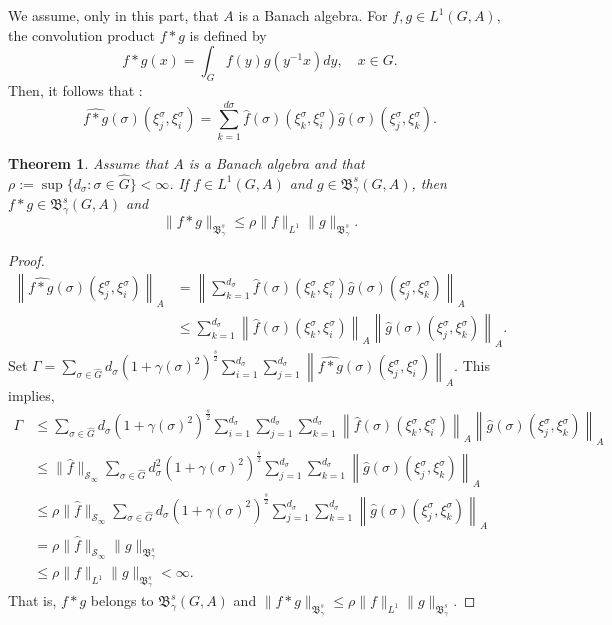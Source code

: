 \documentclass[12pt]{amsart}%
\newtheorem{theorem}{Theorem}[section]
\begin{document}
We assume, only in this part, that $A$ is a Banach algebra.  For $f,g \in L^1(G,A)$,  the convolution product $f\ast g$ is defined by 
\begin{equation}
f\ast g (x)=\int_G f(y)g(y^{-1}x)dy,\quad x\in G.
\end{equation}
Then, it  follows that \cite{Assiamoua2}:
\begin{equation}
\widehat{f\ast g}(\sigma)(\xi_j^\sigma,\xi_i^\sigma)=\sum\limits_{k=1}^{d\sigma}\widehat{f}(\sigma)(\xi_k^\sigma,\xi_i^\sigma)\widehat{g}(\sigma)(\xi_j^\sigma,\xi_k^\sigma). 
\end{equation}
\begin{theorem}
Assume that $A$ is a Banach algebra and  that $\rho:=\sup\{d_\sigma :\sigma\in \widehat{G}\}<\infty$.  If $f\in L^1(G,A)$ and  $g\in \mathfrak{B}^{s}_\gamma(G,A)$, then $f\ast g\in   \mathfrak{B}^{s}_\gamma(G,A)$ and 
$$\|f\ast g\|_{\mathfrak{B}^{s}_\gamma}\leq \rho \|f\|_{L^1}\|g\|_{\mathfrak{B}^{s}_\gamma}.$$
\end{theorem}
\begin{proof}
\begin{align*}
\left\|\widehat{f\ast g}(\sigma)(\xi_j^\sigma,\xi_i^\sigma)\right\|_A &=\left\|\sum\limits_{k=1}^{d_\sigma}\widehat{f}(\sigma)(\xi_k^\sigma,\xi_i^\sigma)\widehat{g}(\sigma)(\xi_j^\sigma,\xi_k^\sigma)\right\|_A\\
&\leq  \sum\limits_{k=1}^{d_\sigma}\left\|\widehat{f}(\sigma)(\xi_k^\sigma,\xi_i^\sigma)\right\|_A\left\|\widehat{g}(\sigma)(\xi_j^\sigma,\xi_k^\sigma)\right\|_A. 
\end{align*}
Set  $\Gamma=\sum\limits_{\sigma\in \widehat{G}}d_\sigma (1+\gamma (\sigma)^2)^{\frac{s}{2}}\sum\limits_{i=1}^{d_\sigma}\sum\limits_{j=1}^{d_\sigma}\left\|\widehat{f\ast g}(\sigma)(\xi_j^\sigma,\xi_i^\sigma)\right\|_A$.
This implies, 
\begin{align*}
\Gamma&\leq \sum_{\sigma\in \widehat{G}}d_\sigma (1+\gamma (\sigma)^2)^{\frac{s}{2}} \sum_{i=1}^{d_\sigma}\sum_{j=1}^{d_\sigma}\sum\limits_{k=1}^{d_\sigma}
\left\|\widehat{f}(\sigma)(\xi_k^\sigma,\xi_i^\sigma)\right\|_A
\left\|\widehat{g}(\sigma)(\xi_j^\sigma,\xi_k^\sigma)\right\|_A\\
&\leq \|\widehat{f}\|_{\mathscr{S}_\infty}\sum_{\sigma\in \widehat{G}}d_\sigma^2 (1+\gamma (\sigma)^2)^{\frac{s}{2}} \sum_{j=1}^{d_\sigma}\sum\limits_{k=1}^{d_\sigma}
\left\|\widehat{g}(\sigma)(\xi_j^\sigma,\xi_k^\sigma)\right\|_A\\
&\leq \rho\|\widehat{f}\|_{\mathscr{S}_\infty}\sum_{\sigma\in \widehat{G}}d_\sigma (1+\gamma (\sigma)^2)^{\frac{s}{2}} \sum_{j=1}^{d_\sigma}\sum\limits_{k=1}^{d_\sigma}
\left\|\widehat{g}(\sigma)(\xi_j^\sigma,\xi_k^\sigma)\right\|_A\\
&=\rho\|\widehat{f}\|_{\mathscr{S}_\infty}\|g\|_{\mathfrak{B}^{s}_\gamma}\\
&\leq \rho\|f\|_{L^1}\|g\|_{\mathfrak{B}^{s}_\gamma}<\infty.
\end{align*}
That is, $f\ast g$ belongs to $\mathfrak{B}^{s}_\gamma (G,A)$ and  $\|f\ast g\|_{\mathfrak{B}^{s}_\gamma}\leq \rho \|f\|_{L^1}\|g\|_{\mathfrak{B}^{s}_\gamma}.$
\end{proof}
\end{document}
